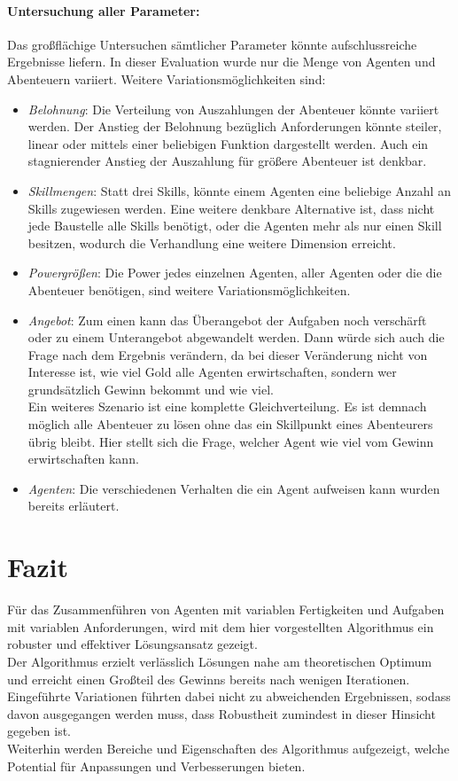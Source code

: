 \documentclass[fleqn,10pt]{SelfArx} %
\begin{document}
\paragraph{Untersuchung aller Parameter:}
Das großflächige Untersuchen sämtlicher Parameter könnte aufschlussreiche Ergebnisse liefern. In dieser Evaluation wurde nur die Menge von Agenten und Abenteuern variiert. Weitere Variationsmöglichkeiten sind:
\begin{itemize}
	\item \textit{Belohnung}: Die Verteilung von Auszahlungen der Abenteuer könnte variiert werden. Der Anstieg der Belohnung bezüglich Anforderungen könnte steiler, linear oder mittels einer beliebigen Funktion dargestellt werden. Auch ein stagnierender Anstieg der Auszahlung für größere Abenteuer ist denkbar.
	\item \textit{Skillmengen}: Statt drei Skills, könnte einem Agenten eine beliebige Anzahl an Skills zugewiesen werden. Eine weitere denkbare Alternative ist, dass nicht jede Baustelle alle Skills benötigt, oder die Agenten mehr als nur einen Skill besitzen, wodurch die Verhandlung eine weitere Dimension erreicht. 
	\item \textit{Powergrößen}: Die Power jedes einzelnen Agenten, aller Agenten oder die die Abenteuer benötigen, sind weitere Variationsmöglichkeiten.
	\item \textit{Angebot}: Zum einen kann das Überangebot der Aufgaben noch verschärft oder zu einem Unterangebot abgewandelt werden. Dann würde sich auch die Frage nach dem Ergebnis verändern, da bei dieser Veränderung nicht von Interesse ist, wie viel Gold alle Agenten erwirtschaften, sondern wer grundsätzlich Gewinn bekommt und wie viel. \\
	Ein weiteres Szenario ist eine komplette Gleichverteilung. Es ist demnach möglich alle Abenteuer zu lösen ohne das ein Skillpunkt eines Abenteurers übrig bleibt. Hier stellt sich die Frage, welcher Agent wie viel vom Gewinn erwirtschaften kann.
	\item \textit{Agenten}: Die verschiedenen Verhalten die ein Agent aufweisen kann wurden bereits erläutert.
\end{itemize}




\section{Fazit}
\label{sec:Conclusion}
Für das Zusammenführen von Agenten mit variablen Fertigkeiten und Aufgaben mit variablen Anforderungen, wird mit dem hier vorgestellten Algorithmus ein robuster und effektiver Lösungsansatz gezeigt.\\ Der Algorithmus erzielt verlässlich Lösungen nahe am theoretischen Optimum und erreicht einen Großteil des Gewinns bereits nach wenigen Iterationen. Eingeführte Variationen führten dabei nicht zu abweichenden Ergebnissen, sodass davon ausgegangen werden muss, dass Robustheit zumindest in dieser Hinsicht gegeben ist.\\ Weiterhin werden Bereiche und Eigenschaften des Algorithmus aufgezeigt, welche Potential für Anpassungen und Verbesserungen bieten.
\end{document}
